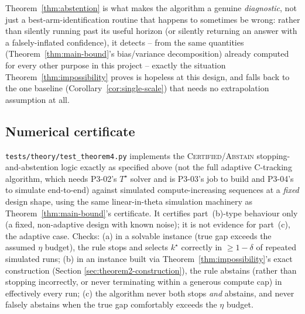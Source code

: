 \begin{remark}
Theorem~\ref{thm:abstention} is what makes the algorithm a genuine \emph{diagnostic}, not
just a best-arm-identification routine that happens to sometimes be wrong: rather than
silently running past its useful horizon (or silently returning an answer with a
falsely-inflated confidence), it detects -- from the same quantities
(Theorem~\ref{thm:main-bound}'s bias/variance decomposition) already computed for every
other purpose in this project -- exactly the situation Theorem~\ref{thm:impossibility}
proves is hopeless at this design, and falls back to the one baseline
(Corollary~\ref{cor:single-scale}) that needs no extrapolation assumption at all.
\end{remark}

\subsection{Numerical certificate}
\label{sec:theorem4-certificate}

\texttt{tests/theory/test\_theorem4.py} implements the \textsc{Certified}/\textsc{Abstain}
stopping-and-abstention logic exactly as specified above (not the full adaptive
C-tracking algorithm, which needs P3-02's $T^\star$ solver and is P3-03's job to build
and P3-04's to simulate end-to-end) against simulated compute-increasing sequences at a
\emph{fixed} design shape, using the same linear-in-theta simulation machinery as
Theorem~\ref{thm:main-bound}'s certificate. It certifies part~(b)-type
behaviour only (a fixed, non-adaptive design with known noise); it is not evidence for
part~(c), the adaptive case. Checks: (a) in a solvable instance (true
gap exceeds the assumed $\eta$ budget), the rule stops and selects $k^\star$ correctly
in $\ge 1-\delta$ of repeated simulated runs; (b) in an instance built via
Theorem~\ref{thm:impossibility}'s exact construction (Section
\ref{sec:theorem2-construction}), the rule abstains (rather than stopping incorrectly,
or never terminating within a generous compute cap) in effectively every run; (c) the
algorithm never both stops \emph{and} abstains, and never falsely abstains when the
true gap comfortably exceeds the $\eta$ budget.

